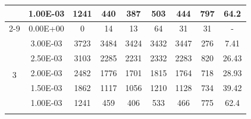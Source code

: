 \begin{table}[H]
{\begin{tabular}{|c|c|c|c|c|c|c|c|c|}
                               & 1.00E-03         & 1241      & 440                                                        & 387                                                       & 503                                                       & 444     & 797    & 64.2                                                               \\ \cline{2-9}
                               & 0.00E+00         & 0         & 14                                                         & 13                                                        & 64                                                        & 31      & 31     & -                                                                  \\ \hline
            \multirow{6}{*}{3} & 3.00E-03         & 3723      & 3484                                                       & 3424                                                      & 3432                                                      & 3447    & 276    & 7.41                                                               \\ \cline{2-9}
                               & 2.50E-03         & 3103      & 2285                                                       & 2231                                                      & 2332                                                      & 2283    & 820    & 26.43                                                              \\ \cline{2-9}
                               & 2.00E-03         & 2482      & 1776                                                       & 1701                                                      & 1815                                                      & 1764    & 718    & 28.93                                                              \\ \cline{2-9}
                               & 1.50E-03         & 1862      & 1117                                                       & 1056                                                      & 1210                                                      & 1128    & 734    & 39.42                                                              \\ \cline{2-9}
                               & 1.00E-03         & 1241      & 459                                                        & 406                                                       & 533                                                       & 466     & 775    & 62.4                                                               \\ \cline{2-9}

\end{tabular}}
\end{table}
